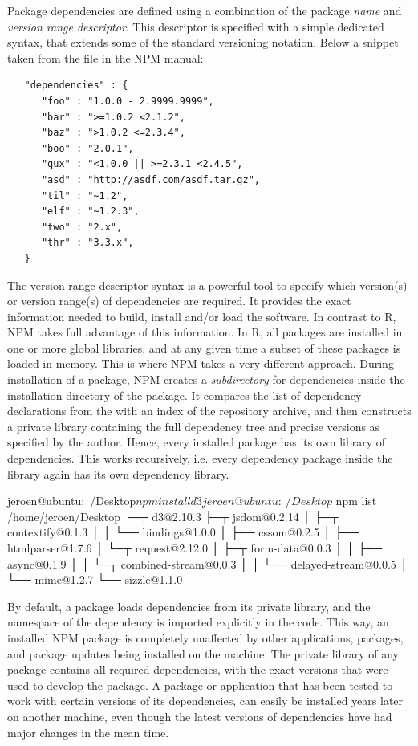 Package dependencies are defined using a combination of the package \emph{name}
and \emph{version range descriptor}. This descriptor is specified with a
simple dedicated syntax, that extends some of the standard versioning notation.
Below a snippet taken from the  file in the NPM manual:

\begin{footnotesize}
\begin{verbatim}
   "dependencies" : {
      "foo" : "1.0.0 - 2.9999.9999",
      "bar" : ">=1.0.2 <2.1.2",
      "baz" : ">1.0.2 <=2.3.4",
      "boo" : "2.0.1",
      "qux" : "<1.0.0 || >=2.3.1 <2.4.5",
      "asd" : "http://asdf.com/asdf.tar.gz",
      "til" : "~1.2",
      "elf" : "~1.2.3",
      "two" : "2.x",
      "thr" : "3.3.x",
   }
\end{verbatim}
\end{footnotesize}
The version range descriptor syntax is a powerful tool to specify
which version(s) or version range(s) of dependencies are required. It provides the exact
information needed to build, install and/or load the software. In contrast to R,
NPM takes full advantage of this information. In R, all packages are installed
in one or more global libraries, and at any given time a subset of these packages
is loaded in memory. This is where NPM takes a very different approach. During
installation of a package, NPM creates a \emph{subdirectory} for dependencies inside
the installation directory of the package. It compares the list of dependency
declarations from the  with an index of the repository archive,
and then constructs a private library containing the full dependency tree and precise
versions as specified by the author. Hence, every installed package has its own library
of dependencies. This works recursively, i.e. every dependency package inside
the library again has its own dependency library.

\begin{codeblock}
jeroen@ubuntu:~/Desktop$ npm install d3
jeroen@ubuntu:~/Desktop$ npm list
/home/jeroen/Desktop
└─┬ d3@2.10.3
  ├─┬ jsdom@0.2.14
  │ ├─┬ contextify@0.1.3
  │ │ └── bindings@1.0.0
  │ ├── cssom@0.2.5
  │ ├── htmlparser@1.7.6
  │ └─┬ request@2.12.0
  │   ├─┬ form-data@0.0.3
  │   │ ├── async@0.1.9
  │   │ └─┬ combined-stream@0.0.3
  │   │   └── delayed-stream@0.0.5
  │   └── mime@1.2.7
  └── sizzle@1.1.0
\end{codeblock}

\noindent By default, a package loads dependencies from its private library, and
the namespace of the dependency is imported explicitly in the code. This way, an
installed NPM package is completely unaffected by other applications, packages,
and package updates being installed on the machine. The private library of any
package contains all required dependencies, with the exact versions that
were used to develop the package. A package or application that has been
tested to work with certain versions of its dependencies, can easily be
installed years later on another machine, even though the latest versions of
dependencies have had major changes in the mean time.

